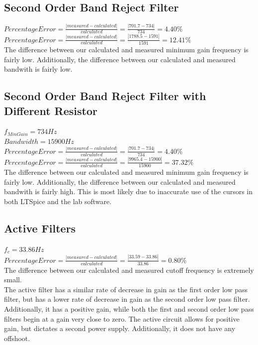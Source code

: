 \documentclass[10pt]{article}
\begin{document}
\subsection*{Second Order Band Reject Filter}
$Percentage Error = \frac{|measured-calculated|}{calculated} = \frac{|701.7-734|}{734} = 4.40\%$\\
$Percentage Error = \frac{|measured-calculated|}{calculated} = \frac{|1788.5-1591|}{1591} = 12.41\%$\\
\noindent The difference between our calculated and measured minimum gain frequency is fairly low. Additionally, the difference between our calculated and measured bandwith is fairly low.

\subsection*{Second Order Band Reject Filter with Different Resistor}
$f_{MinGain} = 734Hz$\\
$Bandwidth = 15900Hz$\\
$Percentage Error = \frac{|measured-calculated|}{calculated} = \frac{|701.7-734|}{734} = 4.40\%$\\
$Percentage Error = \frac{|measured-calculated|}{calculated} = \frac{|9965.4-15900|}{15900} = 37.32\%$\\
\noindent The difference between our calculated and measured minimum gain frequency is fairly low. Additionally, the difference between our calculated and measured bandwith is fairly high. This is most likely due to inaccurate use of the cursors in both LTSpice and the lab software.

\subsection*{Active Filters}
$f_c = 33.86 Hz$\\
$Percentage Error = \frac{|measured-calculated|}{calculated} = \frac{|33.59-33.86|}{33.86} = 0.80\%$\\
\noindent The difference between our calculated and measured cutoff frequency is extremely small.\\

\noindent The active filter has a similar rate of decrease in gain as the first order low pass filter, but has a lower rate of decrease in gain as the second order low pass filter. Additionally, it has a positive gain, while both the first and second order low pass filters begin at a gain very close to zero. The active circuit allows for positive gain, but dictates a second power supply. Additionally, it does not have any offshoot.\\
\end{document}
